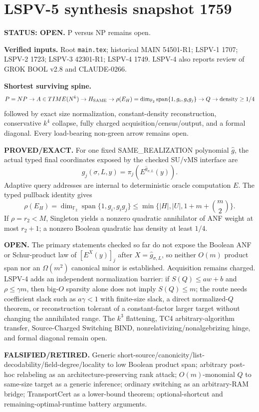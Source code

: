 \documentclass[11pt]{article}
\begin{document}
\section*{LSPV-5 synthesis snapshot 1759}
\textbf{STATUS: OPEN.} P versus NP remains open.

\textbf{Verified inputs.} Root \texttt{main.tex}; historical MAIN 54501-R1; LSPV-1 1707; LSPV-2 1723; LSPV-3 42301-R1; LSPV-4 1749. LSPV-4 also reports review of GROK BOOL v2.8 and CLAUDE-0266.

\textbf{Shortest surviving spine.}
\[
P=NP\to A\in TIME(N^k)\to H_{\rm SAME}\to
\rho(E_H)=\dim_{\mathbb F_2}\operatorname{span}\{1,g_i,g_ig_j\}
\to Q\to \text{density}\ge1/4
\]
followed by exact size normalization, constant-density reconstruction, conservative $k^4$ collapse, fully charged acquisition/census/output, and a formal diagonal. Every load-bearing non-green arrow remains open.

\textbf{PROVED/EXACT.}
For one fixed SAME\_REALIZATION polynomial $\widehat g$, the actual typed final coordinates exposed by the checked SU/vMS interface are
\[
g_j(\sigma,L,y)=\pi_j(E^{\widehat g_{\sigma,L}}(y)).
\]
Adaptive query addresses are internal to deterministic oracle computation $E$. The typed pullback identity gives
\[
\rho(E_H)=\dim_{\mathbb F_2}\operatorname{span}\{1,g_i,g_ig_j\}\le\min\{|H|,|U|,1+m+\binom m2\}.
\]
If $\rho=r_2<M$, Singleton yields a nonzero quadratic annihilator of ANF weight at most $r_2+1$; a nonzero Boolean quadratic has density at least $1/4$.

\textbf{OPEN.}
The primary statements checked so far do not expose the Boolean ANF or Schur-product law of $[E^X(y)]_j$ after $X=\widehat g_{\sigma,L}$, so neither $O(m)$ product span nor an $\Omega(m^2)$ canonical minor is established. Acquisition remains charged. LSPV-4 adds an independent normalization barrier: if $S(Q)\le aw+b$ and $\rho\le\gamma m$, then big-$O$ sparsity alone does not imply $S(Q)\le m$; the route needs coefficient slack such as $a\gamma<1$ with finite-size slack, a direct normalized-$Q$ theorem, or reconstruction tolerant of a constant-factor larger target without changing the annihilated range. The $k^3$ flattening, TC4 arbitrary-algorithm transfer, Source-Charged Switching BIND, nonrelativizing/nonalgebrizing hinge, and formal diagonal remain open.

\textbf{FALSIFIED/RETIRED.}
Generic short-source/canonicity/list-decodability/field-degree/locality to low Boolean product span; arbitrary post-hoc relabeling as an architecture-preserving rank attack; $O(m)$-monomial $Q$ to same-size target as a generic inference; ordinary switching as an arbitrary-RAM bridge; TransportCert as a lower-bound theorem; optional-shortcut and remaining-optimal-runtime battery arguments.
\end{document}
